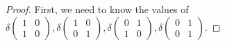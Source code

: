\begin{Exercise}
	\begin{proof}
		First, we need to know the values of $\delta\begin{pmatrix}
		1 & 0 \\
		1 & 0
		\end{pmatrix}, \delta\begin{pmatrix}
		1 & 0 \\
		0 & 1
		\end{pmatrix}, \delta\begin{pmatrix}
		0 & 1 \\
		1 & 0
		\end{pmatrix}, \delta\begin{pmatrix}
		0 & 1 \\
		0 & 1
		\end{pmatrix}$.
		

\end{proof}
\end{Exercise}
